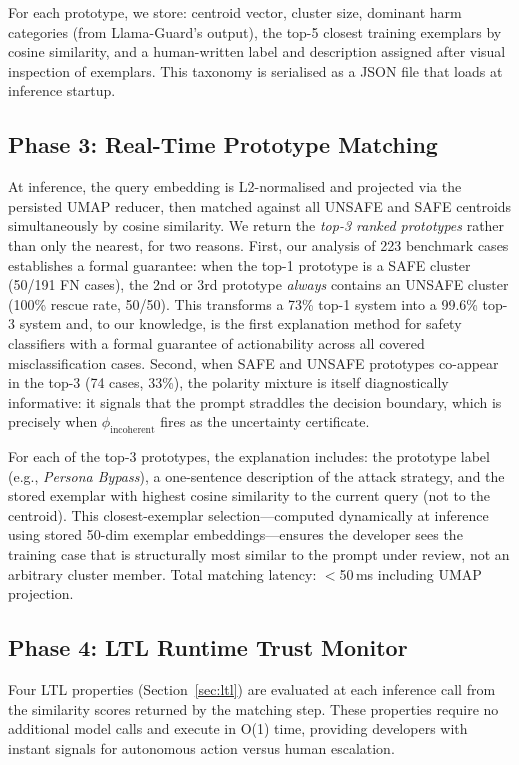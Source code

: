 \documentclass[letterpaper]{article}
\begin{document}
For each prototype, we store: centroid vector, cluster size, dominant harm categories
(from Llama-Guard's output), the top-5 closest training exemplars by cosine similarity,
and a human-written label and description assigned after visual inspection of exemplars.
This taxonomy is serialised as a JSON file that loads at inference startup.

\subsection{Phase 3: Real-Time Prototype Matching}

At inference, the query embedding is L2-normalised and projected via the persisted UMAP
reducer, then matched against all UNSAFE and SAFE centroids simultaneously by cosine
similarity. We return the \emph{top-3 ranked prototypes} rather than only the nearest,
for two reasons. First, our analysis of 223 benchmark cases establishes a formal guarantee:
when the top-1 prototype is a SAFE cluster (50/191 FN cases), the 2nd or 3rd prototype
\emph{always} contains an UNSAFE cluster (100\% rescue rate, 50/50). This transforms a
73\% top-1 system into a 99.6\% top-3 system and, to our knowledge, is the first
explanation method for safety classifiers with a formal guarantee of actionability
across all covered misclassification cases. Second, when SAFE and UNSAFE prototypes
co-appear in the top-3 (74 cases, 33\%), the polarity mixture is itself diagnostically
informative: it signals that the prompt straddles the decision boundary, which is
precisely when $\phi_\text{incoherent}$ fires as the uncertainty certificate.

For each of the top-3 prototypes, the explanation includes: the prototype label (e.g.,
\emph{Persona Bypass}), a one-sentence description of the attack strategy, and the
stored exemplar with highest cosine similarity to the current query (not to the centroid).
This closest-exemplar selection---computed dynamically at inference using stored
50-dim exemplar embeddings---ensures the developer sees the training case that is
structurally most similar to the prompt under review, not an arbitrary cluster member.
Total matching latency: $<$50\,ms including UMAP projection.

\subsection{Phase 4: LTL Runtime Trust Monitor}

Four LTL properties (Section~\ref{sec:ltl}) are evaluated at each inference call from
the similarity scores returned by the matching step. These properties require no
additional model calls and execute in O(1) time, providing developers with instant
signals for autonomous action versus human escalation.
\end{document}
